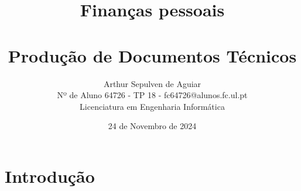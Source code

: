 \documentclass[a4paper,11pt]{report}
\title{
	\Huge{\textbf{Finanças pessoais}} \\
	\vskip 0.25cm \\
	\small{Produção de Documentos Técnicos}
}
\date{24 de Novembro de 2024}
\author{
	\small{ Arthur Sepulven de Aguiar } \\ 
	\small{ Nº de Aluno 64726 - TP 18 - fc64726@alunos.fc.ul.pt} \\
	\small{Licenciatura em Engenharia Informática}
}
\begin{document}
	\maketitle

	\tableofcontents %

	\chapter{Introdução}
\end{document}
